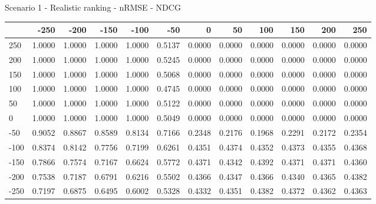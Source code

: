 Scenario 1 - Realistic ranking - nRMSE - NDCG
\begin{tabular}{lrrrrrrrrrrr}
\toprule
{} &   -250 &   -200 &   -150 &   -100 &   -50  &    0   &    50  &    100 &    150 &    200 &    250 \\
\midrule
 250 & 1.0000 & 1.0000 & 1.0000 & 1.0000 & 0.5137 & 0.0000 & 0.0000 & 0.0000 & 0.0000 & 0.0000 & 0.0000 \\
 200 & 1.0000 & 1.0000 & 1.0000 & 1.0000 & 0.5245 & 0.0000 & 0.0000 & 0.0000 & 0.0000 & 0.0000 & 0.0000 \\
 150 & 1.0000 & 1.0000 & 1.0000 & 1.0000 & 0.5068 & 0.0000 & 0.0000 & 0.0000 & 0.0000 & 0.0000 & 0.0000 \\
 100 & 1.0000 & 1.0000 & 1.0000 & 1.0000 & 0.4745 & 0.0000 & 0.0000 & 0.0000 & 0.0000 & 0.0000 & 0.0000 \\
 50  & 1.0000 & 1.0000 & 1.0000 & 1.0000 & 0.5122 & 0.0000 & 0.0000 & 0.0000 & 0.0000 & 0.0000 & 0.0000 \\
 0   & 1.0000 & 1.0000 & 1.0000 & 1.0000 & 0.5049 & 0.0000 & 0.0000 & 0.0000 & 0.0000 & 0.0000 & 0.0000 \\
-50  & 0.9052 & 0.8867 & 0.8589 & 0.8134 & 0.7166 & 0.2348 & 0.2176 & 0.1968 & 0.2291 & 0.2172 & 0.2354 \\
-100 & 0.8374 & 0.8142 & 0.7756 & 0.7199 & 0.6261 & 0.4351 & 0.4374 & 0.4352 & 0.4373 & 0.4355 & 0.4368 \\
-150 & 0.7866 & 0.7574 & 0.7167 & 0.6624 & 0.5772 & 0.4371 & 0.4342 & 0.4392 & 0.4371 & 0.4371 & 0.4360 \\
-200 & 0.7538 & 0.7187 & 0.6791 & 0.6216 & 0.5502 & 0.4366 & 0.4347 & 0.4366 & 0.4340 & 0.4365 & 0.4382 \\
-250 & 0.7197 & 0.6875 & 0.6495 & 0.6002 & 0.5328 & 0.4332 & 0.4351 & 0.4382 & 0.4372 & 0.4362 & 0.4363 \\
\bottomrule
\end{tabular}

